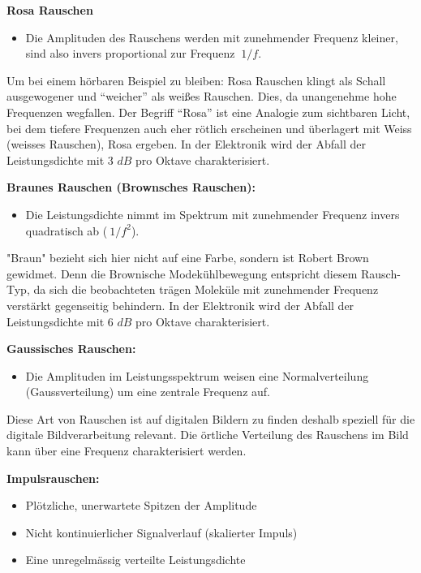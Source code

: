\begin{definition}{\bf Rosa Rauschen}
	\begin{itemize}
		\item Die Amplituden des Rauschens werden mit zunehmender Frequenz kleiner, sind also invers proportional zur Frequenz $ ~1/f $.
	\end{itemize}
\end{definition}


Um bei einem hörbaren Beispiel zu bleiben: Rosa Rauschen klingt als Schall ausgewogener und ``weicher'' als weißes Rauschen. Dies, da unangenehme hohe Frequenzen wegfallen. Der Begriff ``Rosa'' ist eine Analogie zum sichtbaren Licht, bei dem tiefere Frequenzen auch eher rötlich erscheinen und überlagert mit Weiss (weisses Rauschen), Rosa ergeben. In der Elektronik wird der Abfall der Leistungsdichte mit 3 $ dB $ pro Oktave charakterisiert.

\begin{definition}{\bf Braunes Rauschen (Brownsches Rauschen):}
	\begin{itemize}
		\item Die Leistungsdichte nimmt im Spektrum mit zunehmender Frequenz invers quadratisch ab ($ ~1/f^2 $).
	\end{itemize}
\end{definition}


"Braun" bezieht sich hier nicht auf eine Farbe, sondern ist Robert Brown gewidmet. Denn die Brownische Modekühlbewegung entspricht diesem Rausch-Typ, da sich die beobachteten trägen Moleküle mit zunehmender Frequenz verstärkt gegenseitig behindern. In der Elektronik wird der Abfall der Leistungsdichte mit 6 $ dB $ pro Oktave charakterisiert.


\begin{definition}{\bf Gaussisches Rauschen:}
	\begin{itemize}
		\item Die Amplituden im Leistungsspektrum weisen eine Normalverteilung (Gaussverteilung) um eine zentrale Frequenz auf.
	\end{itemize}
\end{definition}


Diese Art von Rauschen ist auf digitalen Bildern zu finden deshalb speziell für die digitale Bildverarbeitung relevant. Die örtliche Verteilung des Rauschens im Bild kann über eine Frequenz charakterisiert werden.


\begin{definition}{\bf Impulsrauschen:}
	\begin{itemize}
		\item Plötzliche, unerwartete Spitzen der Amplitude 
		\item Nicht kontinuierlicher Signalverlauf (skalierter Impuls)
		\item Eine unregelmässig verteilte Leistungsdichte
	\end{itemize}
\end{definition}


